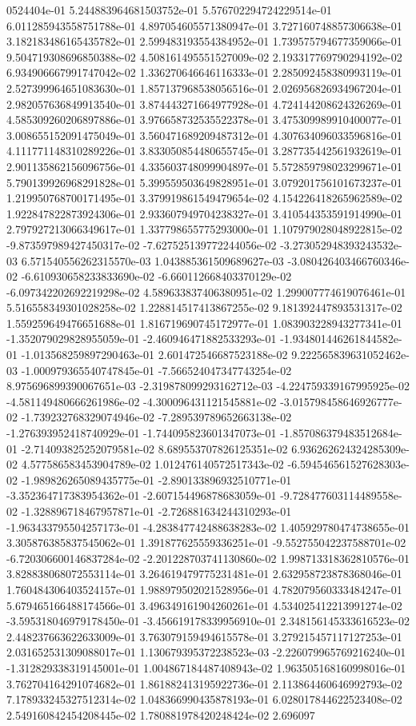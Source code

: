 0524404e-01	5.244883964681503752e-01	5.576702294724229514e-01	6.011285943558751788e-01	4.897054605571380947e-01	3.727160748857306638e-01	3.182183486165435782e-01	2.599483193554384952e-01	1.739575794677359066e-01	9.504719308696850388e-02	4.508161495551527009e-02	2.193317769790294192e-02	6.934906667991747042e-02	1.336270646646116333e-01	2.285092458380993119e-01	2.527399964651083630e-01	1.857137968538056516e-01	2.026956826934967204e-01	2.982057636849913540e-01	3.874443271664977928e-01	4.724144208624326269e-01	4.585309260206897886e-01	3.976658732535522378e-01	3.475309989910400077e-01	3.008655152091475049e-01	3.560471689209487312e-01	4.307634096033596816e-01	4.111771148310289226e-01	3.833050854480655745e-01	3.287735442561932619e-01	2.901135862156096756e-01	4.335603748099904897e-01	5.572859798023299671e-01	5.790139926968291828e-01	5.399559503649828951e-01	3.079201756101673237e-01	1.219950768700171495e-01	3.379919861549479654e-02	4.154226418265962589e-02	1.922847822873924306e-01	2.933607949704238327e-01	3.410544353591914990e-01	2.797927213066349617e-01	1.337798655775293000e-01	1.107979028048922815e-02	-9.873597989427450317e-02	-7.627525139772244056e-02	-3.273052948393243532e-03	6.571540556262315570e-03	1.043885361509689627e-03	-3.080426403466760346e-02	-6.610930658233833690e-02	-6.660112668403370129e-02	-6.097342202692219298e-02	4.589633837406380951e-02	1.299007774619076461e-01	5.516558349301028258e-02	1.228814517413867255e-02	9.181392447893531317e-02	1.559259649476651688e-01	1.816719690745172977e-01	1.083903228943277341e-01	-1.352079029828955059e-01	-2.460946471882533293e-01	-1.934801446261844582e-01	-1.013568259897290463e-01	2.601472546687523188e-02	9.222565839631052462e-03	-1.000979365540747845e-01	-7.566524047347743254e-02	8.975696899390067651e-03	-2.319878099293162712e-03	-4.224759339167995925e-02	-4.581149480666261986e-02	-4.300096431121545881e-02	-3.015798458646926777e-02	-1.739232768329074946e-02	-7.289539789652663138e-02	-1.276393952418740929e-01	-1.744095823601347073e-01	-1.857086379483512684e-01	-2.714093825252079581e-02	8.689553707826125351e-02	6.936262624324285309e-02	4.577586583453904789e-02	1.012476140572517343e-02	-6.594546561527628303e-02	-1.989826265089435775e-01	-2.890133896932510771e-01	-3.352364717383954362e-01	-2.607154496878683059e-01	-9.728477603114489558e-02	-1.328896718467957871e-01	-2.726881634244310293e-01	-1.963433795504257173e-01	-4.283847742488638283e-02	1.405929780474738655e-01	3.305876385837545062e-01	1.391877625559336251e-01	-9.552755042237588701e-02	-6.720306600146837284e-02	-2.201228703741130860e-02	1.998713318362810576e-01	3.828838068072553114e-01	3.264619479775231481e-01	2.632958723878368046e-01	1.760484306403524157e-01	1.988979502021528956e-01	4.782079560333484247e-01	5.679465166488174566e-01	3.496349161904260261e-01	4.534025412213991274e-02	-3.595318046979178450e-01	-3.456619178339956910e-01	2.348156145333616523e-02	2.448237663622633009e-01	3.763079159494615578e-01	3.279215457117127253e-01	2.031652531309088017e-01	1.130679395372238523e-03	-2.226079965769216240e-01	-1.312829338319145001e-01	1.004867184487408943e-02	1.963505168160998016e-01	3.762704164291074682e-01	1.861882413195922736e-01	2.113864460646992793e-02	7.178933245327512314e-02	1.048366990435878193e-01	6.028017844622523408e-02	2.549160842454208445e-02	1.780881978420248424e-02	2.696097